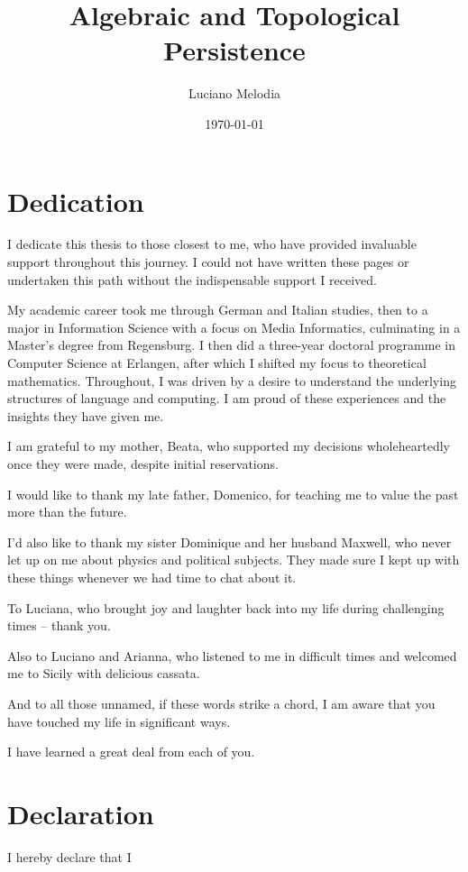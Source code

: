 \documentclass[b5paper, 11pt, twoside]{report}
\title{Algebraic and Topological Persistence}
\author{Luciano Melodia}
\date{\today}
\numberwithin{conj}{section}
\begin{document}
\vspace{0.5cm}



\chapter*{Dedication}
I dedicate this thesis to those closest to me, who have provided invaluable support throughout this journey. I could not have written these pages or undertaken this path without the indispensable support I received.

My academic career took me through German and Italian studies, then to a major in Information Science with a focus on Media Informatics, culminating in a Master's degree from Regensburg. I then did a three-year doctoral programme in Computer Science at Erlangen, after which I shifted my focus to theoretical mathematics. Throughout, I was driven by a desire to understand the underlying structures of language and computing. I am proud of these experiences and the insights they have given me.

I am grateful to my mother, Beata, who supported my decisions wholeheartedly once they were made, despite initial reservations.

I would like to thank my late father, Domenico, for teaching me to value the past more than the future.

I'd also like to thank my sister Dominique and her husband Maxwell, who never let up on me about physics and political subjects. They made sure I kept up with these things whenever we had time to chat about it.

To Luciana, who brought joy and laughter back into my life during challenging times -- thank you.

Also to Luciano and Arianna, who listened to me in difficult times and welcomed me to Sicily with delicious cassata.

And to all those unnamed, if these words strike a chord, I am aware that you have touched my life in significant ways.

I have learned a great deal from each of you.

\chapter*{Declaration}
I hereby declare that I
\end{document}
